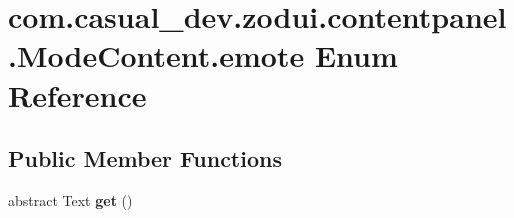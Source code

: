 \hypertarget{enumcom_1_1casual__dev_1_1zodui_1_1contentpanel_1_1_mode_content_1_1emote}{\section{com.\-casual\-\_\-dev.\-zodui.\-contentpanel.\-Mode\-Content.\-emote Enum Reference}
\label{enumcom_1_1casual__dev_1_1zodui_1_1contentpanel_1_1_mode_content_1_1emote}
}
\subsection*{Public Member Functions}
\begin{DoxyCompactItemize}
\item 
\hypertarget{enumcom_1_1casual__dev_1_1zodui_1_1contentpanel_1_1_mode_content_1_1emote_a2162efeaa9eb868f03376fdbeaffd5f5}{abstract Text {\bfseries get} ()}\label{enumcom_1_1casual__dev_1_1zodui_1_1contentpanel_1_1_mode_content_1_1emote_a2162efeaa9eb868f03376fdbeaffd5f5}

\end{DoxyCompactItemize}
